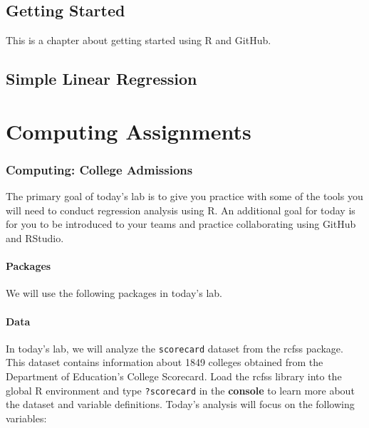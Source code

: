 \documentclass[]{book}
\begin{document}
\chapter{Getting Started}\label{getstarted}

This is a chapter about getting started using R and GitHub.

\chapter{Simple Linear Regression}\label{slr}

\part*{Computing
Assignments}\label{part-computing-assignments}

\section{Computing: College
Admissions}\label{computing-college-admissions}

The primary goal of today's lab is to give you practice with some of the
tools you will need to conduct regression analysis using R. An
additional goal for today is for you to be introduced to your teams and
practice collaborating using GitHub and RStudio.

\subsection{Packages}\label{packages}

We will use the following packages in today's lab.

\subsection{Data}\label{data}

In today's lab, we will analyze the \texttt{scorecard} dataset from the
rcfss package. This dataset contains information about 1849 colleges
obtained from the Department of Education's College Scorecard. Load the
rcfss library into the global R environment and type \texttt{?scorecard}
in the \textbf{console} to learn more about the dataset and variable
definitions. Today's analysis will focus on the following variables:
\end{document}
